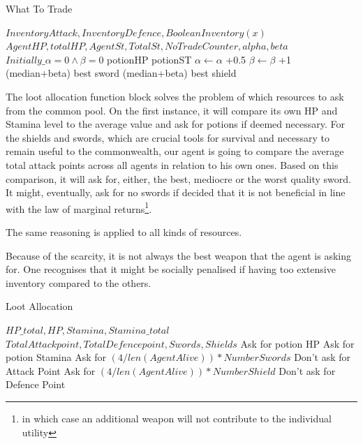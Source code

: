 \begin{algorithm}
\caption{What To Trade}
\begin{algorithmic} 
\Require $InventoryAttack, InventoryDefence, Boolean Inventory(x)$
\Require $AgentHP, totalHP, AgentSt, TotalSt, NoTradeCounter,alpha, beta$
\Ensure $Initially\_\alpha = 0 \land \beta = 0$
\State 
\Return potionHP
\EndIf
{}
\State 
\Return potionST
\EndIf
{}
\State $\alpha \leftarrow \alpha$ +0.5
\State $\beta \leftarrow \beta$ +1
\EndIf
{}
\State 
\Return (median+beta) best sword 
\EndIf
{}
\State 
\Return (median+beta) best shield 
\EndIf
\end{algorithmic}
\end{algorithm}


The loot allocation function block solves the problem of which resources to ask from the common pool. On the first instance, it will compare its own HP and Stamina level to the average value and ask for potions if deemed necessary. For the shields and swords, which are crucial tools for survival and necessary to remain useful to the commonwealth, our agent is going to compare the average total attack points across all agents in relation to his own ones. Based on this comparison, it will ask for, either, the best, mediocre or the worst quality sword. It might, eventually, ask for no swords if decided that it is not beneficial in line with the law of marginal returns\footnote{in which case an additional weapon will not contribute to the individual utility}.

The same reasoning is applied to all kinds of resources.

Because of the scarcity, it is not always the best weapon that the agent is asking for. One recognises that it might be socially penalised if having too extensive inventory compared to the others.


\begin{algorithm}
\caption{Loot Allocation}
\begin{algorithmic} 
\Require $HP\_total, HP, Stamina, Stamina\_total$
\Require $TotalAttackpoint, TotalDefencepoint, Swords, Shields$
\State  Ask for potion HP
\EndIf
{}
\State Ask for potion Stamina
\Else
{}
\State Ask for $(4/len(AgentAlive))*NumberSwords$
\Else
\State Don't ask for Attack Point
\EndIf
{}
\State Ask for $(4/len(AgentAlive))*NumberShield$
\Else
\State Don't ask for Defence Point
\EndIf
\EndIf
\end{algorithmic}
\end{algorithm}



